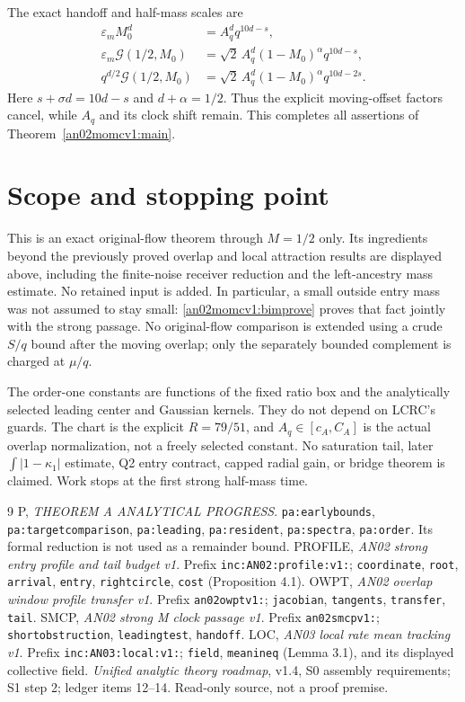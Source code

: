 \documentclass[11pt]{article}
\theoremstyle{remark}\newtheorem{remark}[theorem]{Remark}
\newcommand{\eps}{\varepsilon}
\begin{document}
The exact handoff and half-mass scales are
\begin{align}
 \eps_mM_0^d&=A_q^d q^{10d-s},
 \label{an02momcv1:handoff}\\
 \eps_m\mathcal G(1/2,M_0)
 &=\sqrt2\,A_q^d(1-M_0)^\alpha q^{10d-s},\nonumber\\
 q^{d/2}\mathcal G(1/2,M_0)
 &=\sqrt2\,A_q^d(1-M_0)^\alpha q^{10d-2s}.
 \label{an02momcv1:terminalscales}
\end{align}
Here $s+\sigma d=10d-s$ and $d+\alpha=1/2$.
Thus the explicit moving-offset factors cancel, while $A_q$
and its clock shift remain. This completes all assertions of
Theorem~\ref{an02momcv1:main}.

\section{Scope and stopping point}
This is an exact original-flow theorem through $M=1/2$ only.
Its ingredients beyond the previously proved overlap and local
attraction results are displayed above, including the finite-noise
receiver reduction and the left-ancestry mass estimate.
No retained input is added. In particular, a small outside entry
mass was not assumed to stay small: \eqref{an02momcv1:bimprove}
proves that fact jointly with the strong passage.
No original-flow comparison is extended using a crude $S/q$ bound
after the moving overlap; only the separately bounded complement
is charged at $\mu/q$.

The order-one constants are functions of the fixed ratio box and
the analytically selected leading center and Gaussian kernels.
They do not depend on LCRC's guards. The chart is the explicit
$R=79/51$, and $A_q\in[c_A,C_A]$ is the actual overlap
normalization, not a freely selected constant.
No saturation tail, later $\int|1-\kappa_1|$ estimate,
Q2 entry contract, capped radial gain, or bridge theorem is claimed.
Work stops at the first strong half-mass time.

\begin{thebibliography}{9}\small
{} P, \emph{THEOREM A ANALYTICAL PROGRESS}.
\texttt{pa:earlybounds}, \texttt{pa:targetcomparison},
\texttt{pa:leading}, \texttt{pa:resident}, \texttt{pa:spectra},
\texttt{pa:order}. Its formal reduction is not used as a remainder bound.
 PROFILE, \emph{AN02 strong entry profile and tail budget v1}.
Prefix \texttt{inc:AN02:profile:v1:}; \texttt{coordinate},
\texttt{root}, \texttt{arrival}, \texttt{entry}, \texttt{rightcircle},
\texttt{cost} (Proposition 4.1).
 OWPT, \emph{AN02 overlap window profile transfer v1}.
Prefix \texttt{an02owptv1:}; \texttt{jacobian}, \texttt{tangents},
\texttt{transfer}, \texttt{tail}.
 SMCP, \emph{AN02 strong M clock passage v1}.
Prefix \texttt{an02smcpv1:}; \texttt{shortobstruction},
\texttt{leadingtest}, \texttt{handoff}.
 LOC, \emph{AN03 local rate mean tracking v1}.
Prefix \texttt{inc:AN03:local:v1:}; \texttt{field},
\texttt{meanineq} (Lemma 3.1), and its displayed collective field.
 \emph{Unified analytic theory roadmap}, v1.4,
S0 assembly requirements; S1 step 2; ledger items 12--14.
Read-only source, not a proof premise.
\end{thebibliography}
\end{document}
